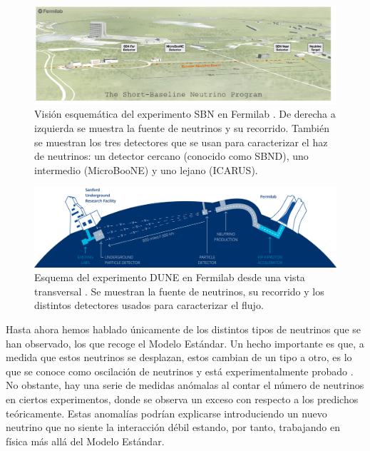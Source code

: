 \documentclass[a4paper,12pt,oneside,titlepage]{book}
\begin{document}
\begin{figure}[h!]
  \centering
  \includegraphics[scale=0.55]{snb.PNG}
  \caption{Visión esquemática del experimento SBN en Fermilab \cite{sbnd}. De derecha a izquierda se muestra la fuente de neutrinos y su recorrido. También se muestran los tres detectores que se usan para caracterizar el haz de neutrinos: un detector cercano (conocido como SBND), uno intermedio (MicroBooNE) y uno lejano (ICARUS).}
  \label{fig:snb_cap}
\end{figure}

\begin{figure}[h!]
  \centering
  \includegraphics[scale=0.25, center]{detector_bajo.png}
  \caption{Esquema del experimento DUNE en Fermilab desde una vista transversal \cite{dune_url}. Se muestran la fuente de neutrinos, su recorrido y los distintos detectores usados para caracterizar el flujo.}
  \label{fig:snb_cap_2}
\end{figure}

Hasta ahora hemos hablado únicamente de los distintos tipos de neutrinos que se han observado, los que recoge el Modelo Estándar. Un hecho importante es que, a medida que estos neutrinos se desplazan, estos cambian de un tipo a otro, es lo que se conoce como oscilación de neutrinos y está experimentalmente probado \cite{oscilation}. No obstante, hay una serie de medidas anómalas al contar el número de neutrinos en ciertos experimentos, donde se observa un exceso con respecto a los predichos teóricamente. Estas anomalías podrían explicarse introduciendo un nuevo neutrino que no siente la interacción débil \cite{sbnd} estando, por tanto, trabajando en física más allá del Modelo Estándar.
\end{document}
